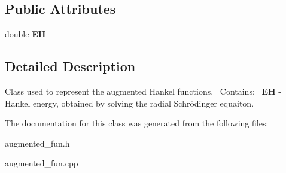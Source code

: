 \subsection*{Public Attributes}
\begin{DoxyCompactItemize}
\item 
\mbox{\label{classAugmented__Hankel_ae2141e9ffe838e2d45fef18514bc3ce6}} 
double {\bfseries EH}
\end{DoxyCompactItemize}


\subsection{Detailed Description}
Class used to represent the augmented Hankel functions.~\newline
Contains\+:~\newline
{\bfseries EH} -\/ Hankel energy, obtained by solving the radial Schrödinger equaiton.~\newline


The documentation for this class was generated from the following files\+:\begin{DoxyCompactItemize}
\item 
augmented\+\_\+fun.\+h\item 
augmented\+\_\+fun.\+cpp\end{DoxyCompactItemize}
